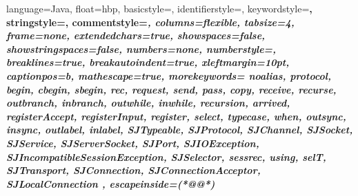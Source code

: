 \newcommand{\ARG}[1]{{\rm\em #1}}

\newcommand{\CODESIZE}{\small} %
\newcommand{\LISTINGSIZE}{\fontsize{8}{10}\selectfont} %
\newcommand{\CODE}[1]{\texttt{\CODESIZE #1}} %
\newcommand{\LST}[1]{\lstinline@#1@} %

\newcommand{\OPIN}[2]{\ensuremath{\CODE{#1}(#2)}} %
\newcommand{\OPOUT}[2]{\ensuremath{\CODE{#1}\langle #2 \rangle}} %
\newcommand{\PARTY}[1]{\ensuremath{\textbf{#1}}} %

\newcommand{\LISTINGSTYLE}{\ttfamily\LISTINGSIZE}

\lstset
{
	language=Java,
	float=hbp,
	basicstyle=\ttfamily\CODESIZE, %
	identifierstyle=\color{Black},
	keywordstyle=\bfseries\color{blue},
	stringstyle=\color{Violet},
	commentstyle=\itshape\color{RedViolet},
	columns=flexible,
	tabsize=4,
	frame=none,
	extendedchars=true,
	showspaces=false,
	showstringspaces=false,
	numbers=none,
	numberstyle=\tiny,
	breaklines=true,
	breakautoindent=true,
	xleftmargin=10pt,
	captionpos=b,
	mathescape=true,
	morekeywords=
	{	
		noalias,
		protocol, begin, cbegin, sbegin, rec,
		request, send, pass, copy, receive, recurse, 
		outbranch, inbranch, outwhile, inwhile, recursion, 
		arrived, registerAccept, registerInput, register, select, 
		typecase, when, 
		outsync, insync, outlabel, inlabel, 
		SJTypeable, SJProtocol, SJChannel, SJSocket, SJService, SJServerSocket, SJPort, 
		SJIOException, SJIncompatibleSessionException, 
		SJSelector,  
		sessrec, 
		using,
                selT,
		SJTransport,  SJConnection,  SJConnectionAcceptor,  SJLocalConnection
	},
	escapeinside={(*@}{@*)}
}



